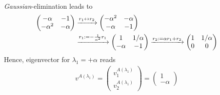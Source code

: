 \documentclass[12pt]{article}
\begin{document}
\begin{enumerate}
\begin{enumerate}
\begin{align}
		            \end{align}
		            \emph{Gaussian}-elimination leads to
		            \begin{align}
			            \begin{pmatrix} -\alpha &-1\\-\alpha^2 & -\alpha \end{pmatrix}
			             & \xrightarrow{\begin{subarray}{l}r_{1} \leftrightarrow r_{2}\end{subarray}}
			            \begin{pmatrix} -\alpha^2 & -\alpha\\ -\alpha &-1 \end{pmatrix}\notag            \\
			             & \xrightarrow{\begin{subarray}{l}r_{1}:=-\frac{1}{\alpha^2} r_{1}\end{subarray}}
			            \begin{pmatrix} 1 &1/\alpha\\-\alpha & -1 \end{pmatrix}
			            \xrightarrow{\begin{subarray}{l}r_{2}:=\alpha r_{1}+r_{2} \end{subarray}}
			            \begin{pmatrix} 1 &1/\alpha\\0 & 0 \end{pmatrix}
		            \end{align}
		            Hence, eigenvector for $\lambda_{1} = +\alpha$ reads
		            \begin{align}
			            v^{A(\lambda_{1})}
			            =\begin{pmatrix} v^{A(\lambda_{1})}_{1}\\v^{A(\lambda_{1})}_{2} \end{pmatrix}
			            =\begin{pmatrix} 1\\ -\alpha \end{pmatrix}
		            \end{align}
		            

\end{enumerate}
\end{enumerate}
\end{document}

